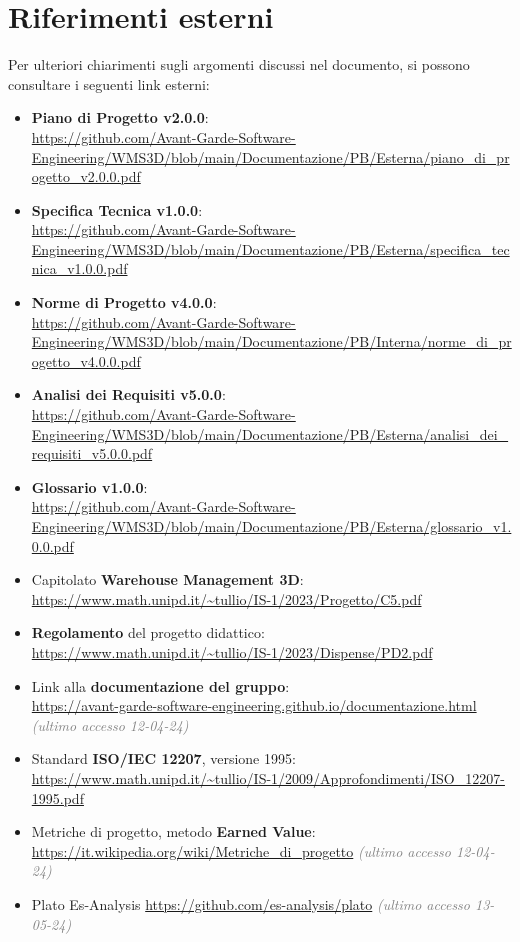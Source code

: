 \section{Riferimenti esterni} \label{sec:riferimenti_esterni}
Per ulteriori chiarimenti sugli argomenti discussi nel documento, si possono consultare i seguenti link esterni:
\begin{itemize}
    \item \textbf{Piano di Progetto v2.0.0}:\\
    \url{https://github.com/Avant-Garde-Software-Engineering/WMS3D/blob/main/Documentazione/PB/Esterna/piano_di_progetto_v2.0.0.pdf}
    \item \textbf{Specifica Tecnica v1.0.0}:\\
    \url{https://github.com/Avant-Garde-Software-Engineering/WMS3D/blob/main/Documentazione/PB/Esterna/specifica_tecnica_v1.0.0.pdf}
    \item \textbf{Norme di Progetto v4.0.0}:\\
    \url{https://github.com/Avant-Garde-Software-Engineering/WMS3D/blob/main/Documentazione/PB/Interna/norme_di_progetto_v4.0.0.pdf}
    \item \textbf{Analisi dei Requisiti v5.0.0}:\\
    \url{https://github.com/Avant-Garde-Software-Engineering/WMS3D/blob/main/Documentazione/PB/Esterna/analisi_dei_requisiti_v5.0.0.pdf}
    \item \textbf{Glossario v1.0.0}:\\
    \url{https://github.com/Avant-Garde-Software-Engineering/WMS3D/blob/main/Documentazione/PB/Esterna/glossario_v1.0.0.pdf}
    \item Capitolato \textbf{Warehouse Management 3D}:\\
    \url{https://www.math.unipd.it/~tullio/IS-1/2023/Progetto/C5.pdf}
    \item \textbf{Regolamento} del progetto didattico:\\
    \url{https://www.math.unipd.it/~tullio/IS-1/2023/Dispense/PD2.pdf}
    \item Link alla \textbf{documentazione del gruppo}:\\
    \url{https://avant-garde-software-engineering.github.io/documentazione.html} \textcolor{gray}{\textit{(ultimo accesso 12-04-24)}}
    \item Standard \textbf{ISO/IEC 12207}, versione 1995:\\
    \url{https://www.math.unipd.it/~tullio/IS-1/2009/Approfondimenti/ISO_12207-1995.pdf}
    \item Metriche di progetto, metodo \textbf{Earned Value}:\\
    \url{https://it.wikipedia.org/wiki/Metriche_di_progetto} \textcolor{gray}{\textit{(ultimo accesso 12-04-24)}}
    \item Plato Es-Analysis \url{https://github.com/es-analysis/plato} \textcolor{gray}{\textit{(ultimo accesso 13-05-24)}}
\end{itemize}
